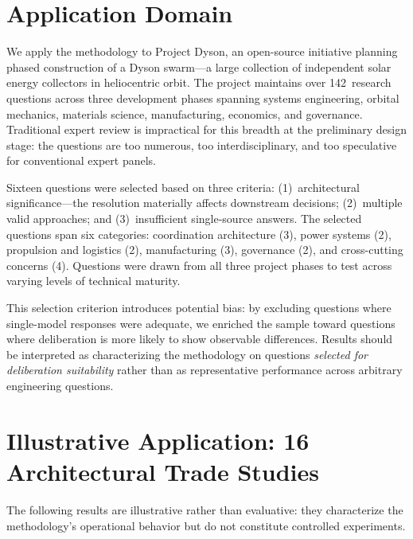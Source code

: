 \documentclass[11pt,a4paper]{article}
\begin{document}
\section{Application Domain}
\label{sec:domain}

We apply the methodology to Project Dyson, an open-source initiative planning phased construction of a Dyson swarm---a large collection of independent solar energy collectors in heliocentric orbit. The project maintains over 142~research questions across three development phases spanning systems engineering, orbital mechanics, materials science, manufacturing, economics, and governance. Traditional expert review is impractical for this breadth at the preliminary design stage: the questions are too numerous, too interdisciplinary, and too speculative for conventional expert panels.

Sixteen questions were selected based on three criteria: (1)~architectural significance---the resolution materially affects downstream decisions; (2)~multiple valid approaches; and (3)~insufficient single-source answers. The selected questions span six categories: coordination architecture (3), power systems (2), propulsion and logistics (2), manufacturing (3), governance (2), and cross-cutting concerns (4). Questions were drawn from all three project phases to test across varying levels of technical maturity.

This selection criterion introduces potential bias: by excluding questions where single-model responses were adequate, we enriched the sample toward questions where deliberation is more likely to show observable differences. Results should be interpreted as characterizing the methodology on questions \emph{selected for deliberation suitability} rather than as representative performance across arbitrary engineering questions.

\section{Illustrative Application: 16 Architectural Trade Studies}
\label{sec:results}

The following results are illustrative rather than evaluative: they characterize the methodology's operational behavior but do not constitute controlled experiments.
\end{document}
